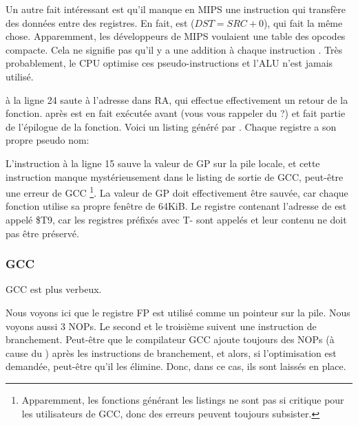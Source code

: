 Un autre fait intéressant est qu'il manque en MIPS une instruction qui transfère
des données entre des registres.
En fait,   est  ($DST=SRC+0$), qui
fait la même chose.
Apparemment, les développeurs de MIPS voulaient une table des opcodes compacte.
Cela ne signifie pas qu'il y a une addition à chaque instruction .
Très probablement, le \ac{CPU} optimise ces pseudo-instructions et l'\ac{ALU} n'est
jamais utilisé.


 à la ligne 24 saute à l'adresse dans \ac{RA}, qui effectue effectivement
un retour de la fonction.
 après  est en fait exécutée avant  (vous vous rappeler
du ?) et fait partie de l'épilogue de la fonction.
Voici un listing généré par \IDA. Chaque registre a son propre pseudo nom:



L'instruction à la ligne 15 sauve la valeur de GP sur la pile locale, et cette
instruction manque mystérieusement dans le listing de sortie de GCC, peut-être
une erreur de GCC
\footnote{Apparemment, les fonctions générant les listings ne sont pas si critique
pour les utilisateurs de GCC, donc des erreurs peuvent toujours subsister.}.
La valeur de GP doit effectivement être sauvée, car chaque fonction utilise sa
propre fenêtre de 64KiB.
Le registre contenant l'adresse de \puts est appelé \$T9, car les registres
préfixés avec T- sont appelés  et leur contenu ne doit pas être
préservé. 

\subsubsection{GCC \NonOptimizing}

GCC \NonOptimizing est plus verbeux.



Nous voyons ici que le registre FP est utilisé comme un pointeur sur la pile.
Nous voyons aussi 3 \ac{NOP}s.
Le second et le troisième suivent une instruction de branchement.
Peut-être que le compilateur GCC ajoute toujours des \ac{NOP}s (à cause du
) après les instructions de branchement, et
alors, si l'optimisation est demandée, peut-être qu'il les élimine.
Donc, dans ce cas, ils sont laissés en place.

